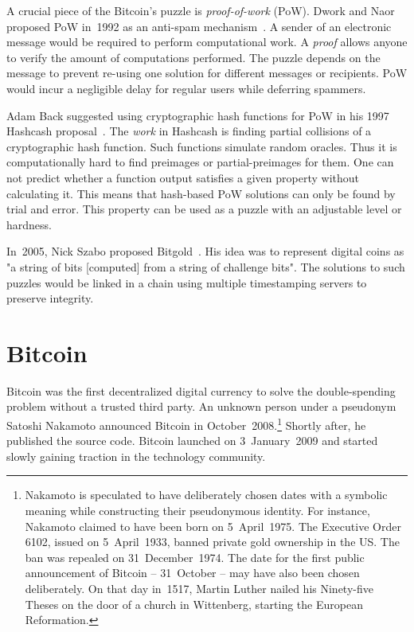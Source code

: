 A crucial piece of the Bitcoin's puzzle is \textit{proof-of-work} (PoW).
Dwork and Naor proposed PoW in~1992 as an anti-spam mechanism~\cite{Dwork1992}.
A sender of an electronic message would be required to perform computational work.
A \textit{proof} allows anyone to verify the amount of computations performed.
The puzzle depends on the message to prevent re-using one solution for different messages or recipients.
PoW would incur a negligible delay for regular users while deferring spammers.

Adam Back suggested using cryptographic hash functions for PoW in his 1997 Hashcash proposal~\cite{Back1997}.
The \textit{work} in Hashcash is finding partial collisions of a cryptographic hash function.
Such functions simulate random oracles.
Thus it is computationally hard to find preimages or partial-preimages for them.
One can not predict whether a function output satisfies a given property without calculating it.
This means that hash-based PoW solutions can only be found by trial and error.
This property can be used as a puzzle with an adjustable level or hardness.

In~2005, Nick Szabo proposed Bitgold~\cite{Szabo2005}.
His idea was to represent digital coins as "a string of bits [computed] from a string of challenge bits".
The solutions to such puzzles would be linked in a chain using multiple timestamping servers to preserve integrity.


\section{Bitcoin}

Bitcoin was the first decentralized digital currency to solve the double-spending problem without a trusted third party.
An unknown person under a pseudonym Satoshi Nakamoto announced Bitcoin in October~2008.\footnote{Nakamoto is speculated to have deliberately chosen dates with a symbolic meaning while constructing their pseudonymous identity. For instance, Nakamoto claimed to have been born on 5~April~1975. The Executive Order 6102, issued on 5~April~1933, banned private gold ownership in the US. The ban was repealed on 31~December~1974. The date for the first public announcement of Bitcoin -- 31~October -- may have also been chosen deliberately. On that day in~1517, Martin Luther nailed his Ninety-five Theses on the door of a church in Wittenberg, starting the European Reformation.}
Shortly after, he published the source code.
Bitcoin launched on 3~January~2009 and started slowly gaining traction in the technology community.

